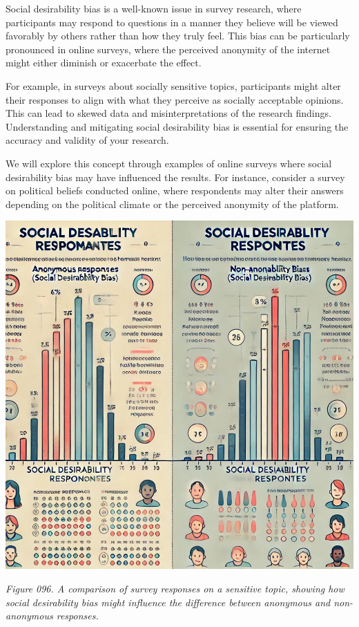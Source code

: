 \documentclass[
]{book}
\begin{document}
Social desirability bias is a well-known issue in survey research, where participants may respond to questions in a manner they believe will be viewed favorably by others rather than how they truly feel. This bias can be particularly pronounced in online surveys, where the perceived anonymity of the internet might either diminish or exacerbate the effect.

For example, in surveys about socially sensitive topics, participants might alter their responses to align with what they perceive as socially acceptable opinions. This can lead to skewed data and misinterpretations of the research findings. Understanding and mitigating social desirability bias is essential for ensuring the accuracy and validity of your research.

We will explore this concept through examples of online surveys where social desirability bias may have influenced the results. For instance, consider a survey on political beliefs conducted online, where respondents may alter their answers depending on the political climate or the perceived anonymity of the platform.

\includegraphics[width=1\textwidth,height=\textheight]{images/fig096.jpg}

\emph{Figure 096. A comparison of survey responses on a sensitive topic, showing how social desirability bias might influence the difference between anonymous and non-anonymous responses.}
\end{document}

